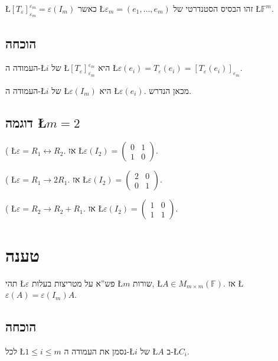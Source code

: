 \documentclass[english,hebrew]{article}
\begin{document}
\L{$[T_{\varepsilon}]_{\varepsilon_{m}}^{\varepsilon_{m}}=\varepsilon(I_{m})$}
כאשר \L{$\varepsilon_{m}=(e_{1},\dots,e_{m})$} זהו הבסיס הסטנדרטי
של \L{$\mathbb{F}^{m}$}.

\subsection{הוכחה}

העמודה ה-\L{$i$} של \L{$[T_{\varepsilon}]_{\varepsilon_{m}}^{\varepsilon_{m}}$}
היא \L{$\varepsilon(e_{i})=T_{\varepsilon}(e_{i})=[T_{\varepsilon}(e_{i})]_{\varepsilon_{m}}$}.

העמודה ה-\L{$i$} של \L{$\varepsilon(I_{m})$} היא \L{$\varepsilon(e_{i})$}.
מכאן הנדרש.

\subsection{דוגמה\qquad{} \L{$m=2$}}

{\endL}( \L{$\varepsilon=R_{1}\leftrightarrow R_{2}$}. אז
\L{$\varepsilon(I_{2})=\begin{pmatrix}0 & 1\\
1 & 0
\end{pmatrix}$}.

{\endL}( \L{$\varepsilon=R_{1}\rightarrow2R_{1}$}. אז \L{$\varepsilon(I_{2})=\begin{pmatrix}2 & 0\\
0 & 1
\end{pmatrix}$}.

{\endL}( \L{$\varepsilon=R_{2}\rightarrow R_{2}+R_{1}$}.
אז \L{$\varepsilon(I_{2})=\begin{pmatrix}1 & 0\\
1 & 1
\end{pmatrix}$}.

\section{טענה}

תהי \L{$\varepsilon$} פש\textquotedblright א על מטריצות בעלות \L{$m$}
שורות, \L{$A\in M_{m\times m}(\mathbb{F})$}. אז \L{$\varepsilon(A)=\varepsilon(I_{m})A$}.

\subsection{הוכחה}

לכל \L{$1\leq i\leq m$} נסמן את העמודה ה-\L{$i$} של \L{$A$} ב-\L{$C_{i}$}.
\end{document}
